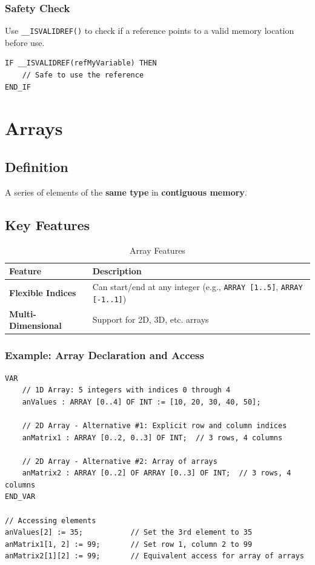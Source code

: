 \documentclass[11pt,a4paper]{article}
\begin{document}
\subsubsection{Safety Check}

Use \texttt{\_\_ISVALIDREF()} to check if a reference points to a valid memory location before use.

\begin{lstlisting}
IF __ISVALIDREF(refMyVariable) THEN
    // Safe to use the reference
END_IF
\end{lstlisting}

\section{Arrays}

\subsection{Definition}

A series of elements of the \textbf{same type} in \textbf{contiguous memory}.

\subsection{Key Features}

\begin{table}[h]
\centering
\begin{tabular}{@{}ll@{}}
\toprule
\textbf{Feature} & \textbf{Description} \\
\midrule
\textbf{Flexible Indices} & Can start/end at any integer (e.g., \texttt{ARRAY [1..5]}, \texttt{ARRAY [-1..1]}) \\
\textbf{Multi-Dimensional} & Support for 2D, 3D, etc. arrays \\
\bottomrule
\end{tabular}
\caption{Array Features}
\end{table}

\subsubsection*{Example: Array Declaration and Access}

\begin{lstlisting}
VAR
    // 1D Array: 5 integers with indices 0 through 4
    anValues : ARRAY [0..4] OF INT := [10, 20, 30, 40, 50];
    
    // 2D Array - Alternative #1: Explicit row and column indices
    anMatrix1 : ARRAY [0..2, 0..3] OF INT;  // 3 rows, 4 columns
    
    // 2D Array - Alternative #2: Array of arrays
    anMatrix2 : ARRAY [0..2] OF ARRAY [0..3] OF INT;  // 3 rows, 4 columns
END_VAR

// Accessing elements
anValues[2] := 35;           // Set the 3rd element to 35
anMatrix1[1, 2] := 99;       // Set row 1, column 2 to 99
anMatrix2[1][2] := 99;       // Equivalent access for array of arrays
\end{lstlisting}
\end{document}
